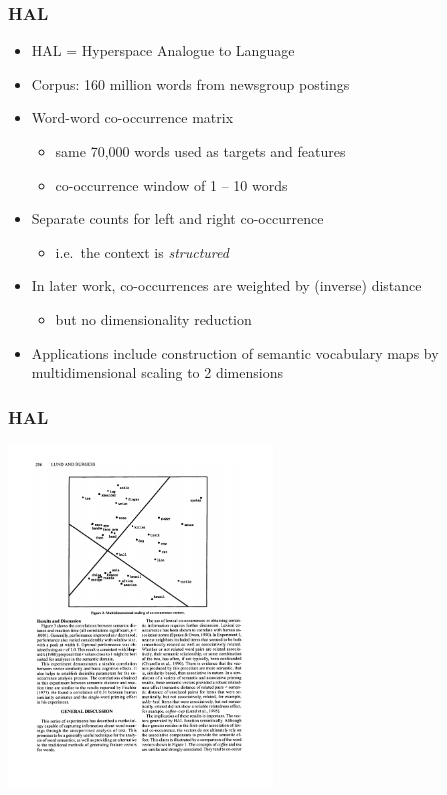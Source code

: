 \documentclass[t]{beamer} %
\begin{document}
\begin{frame}
  \frametitle{HAL \citep{Lund:Burgess:96}}

  \begin{itemize}
  \item HAL = Hyperspace Analogue to Language
  \item Corpus: 160 million words from newsgroup postings
  \item Word-word co-occurrence matrix
    \begin{itemize}
    \item same 70,000 words used as targets and features
    \item co-occurrence window of 1 -- 10 words
    \end{itemize}
  \item Separate counts for left and right co-occurrence
    \begin{itemize}
    \item i.e.\ the context is \emph{structured}
    \end{itemize}
  \item In later work, co-occurrences are weighted by (inverse) distance \citep{Li:Burgess:Lund:00}
    \begin{itemize}
      \item but no dimensionality reduction
    \end{itemize}
  \item Applications include construction of semantic vocabulary maps
    by multidimensional scaling to 2 dimensions
  \end{itemize}
\end{frame}

\begin{frame}
  \frametitle{HAL \citep{Lund:Burgess:96}}

  \begin{center}
    \includegraphics[width=7cm]{img/LundBurgess1996_semantic_map}
  \end{center}
\end{frame}
\end{document}
